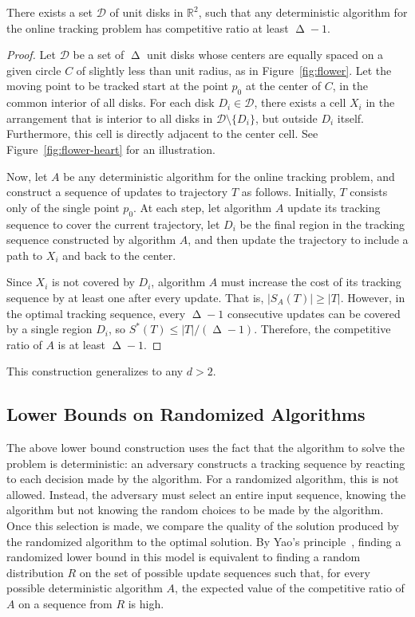 \documentclass[runningheads]{llncs}
\newcommand {\mathset} [1] {\ensuremath {\mathbb {#1}}}
\newcommand {\R} {\mathset {R}}
\newcommand {\script} [1] {\ensuremath {\mathcal {#1}}}
\DeclareMathOperator {\ply}{\Delta}
\begin{document}
\begin {theorem} \label {thm:lowerbound_determ}
There exists a set $\script D$ of unit disks in $\R^2$, such that any deterministic algorithm for the online tracking problem has competitive ratio at least $\ply-1$.
\end {theorem}

\begin {proof}
Let $\script D$ be a set of $\ply$ unit disks whose centers are equally spaced on a given circle $C$ of slightly less than unit radius, as in Figure~\ref {fig:flower}. Let the moving point to be tracked start at the point $p_0$ at the center of $C$, in the common interior of all disks. For each disk $D_i \in \script D$, there exists a cell $X_i$ in the arrangement that is interior to all disks in $\script D \setminus\{D_i\}$, but outside $D_i$ itself. Furthermore, this cell is directly adjacent to the center cell. See Figure~\ref {fig:flower-heart} for an illustration.

Now, let $A$ be any deterministic algorithm for the online tracking problem, and construct a sequence of updates to trajectory $T$ as follows. Initially, $T$ consists only of the single point $p_0$. At each step, let algorithm $A$ update its tracking sequence to cover the current trajectory, let $D_i$ be the final region in the tracking sequence constructed by algorithm $A$, and then update the trajectory to include a path to $X_i$ and back to the center.

Since $X_i$ is not covered by $D_i$, algorithm $A$ must increase the cost of its tracking sequence by at least one after every update. That is, $|S_A(T)|\ge|T|$. However, in the optimal tracking sequence, every $\ply-1$ consecutive updates can be covered by a single region $D_i$, so $S^*(T)\le|T|/(\ply-1)$. Therefore, the competitive ratio of $A$ is at least $\ply-1$.
\end {proof}
      
This construction generalizes to any $d > 2$.

\subsection{Lower Bounds on Randomized Algorithms} \label {sec:lowerbounds_random}
The above lower bound construction uses the fact that the algorithm to solve the problem is deterministic: an adversary constructs a tracking sequence by reacting to each decision made by the algorithm. For a randomized algorithm, this is not allowed. Instead, the adversary must
select an entire input sequence, knowing the algorithm but not knowing the random choices to be made by the algorithm. Once this selection is made, we compare the quality of the solution produced by the randomized algorithm to the optimal solution.
By Yao's principle~\cite{cllr-bbcr-97,Yao-FOCS-77}, 
finding a randomized lower bound in this model is equivalent to finding a random distribution $R$ on the set of possible update sequences such that, for every possible deterministic algorithm $A$, the expected value of the competitive ratio of $A$ on a sequence from $R$ is high.
\end{document}
